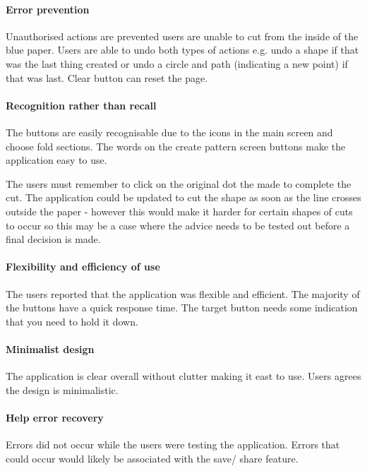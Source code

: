 \documentclass[11pt]{article}
\begin{document}
                \paragraph{Error prevention}
                Unauthorised actions are prevented users are unable to cut from the inside of the blue paper. Users are able to undo both types of actions e.g. undo a shape if that was the last thing created or undo a circle and path (indicating a new point) if that was last. Clear button can reset the page. 

                \paragraph{Recognition rather than recall}
                The buttons are easily recognisable due to the icons in the main screen and choose fold sections. The words on the create pattern screen buttons make the application easy to use. 
                
                The users must remember to click on the original dot the made to complete the cut. The application could be updated to cut the shape as soon as the line crosses outside the paper - however this would make it harder for certain shapes of cuts to occur so this may be a case where the advice needs to be tested out before a final decision is made.


                \paragraph{Flexibility and efficiency of use} 
                The users reported that the application was flexible and efficient. The majority of the buttons have a quick response time. The target button needs some indication that you need to hold it down.

                \paragraph{Minimalist design}
                The application is clear overall without clutter making it east to use. Users agrees the design is minimalistic. 

                \paragraph{Help error recovery}
                Errors did not occur while the users were testing the application. Errors that could occur would likely be associated with the save/ share feature.
\end{document}
